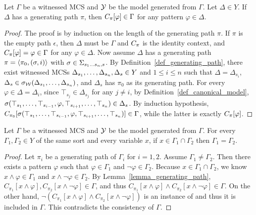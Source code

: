 \documentclass{amsart}
\begin{document}
\begin{lemma}
\label{lemma_generating_path}
Let $\Gamma$ be a witnessed MCS and
$\mathcal{Y}$ be the model generated from $\Gamma$.
Let $\Delta \in Y$.
If $\Delta$ has a generating path $\pi$,
then
${C_\pi}[\varphi] \in \Gamma$
for any pattern $\varphi \in \Delta$.
\end{lemma}
\begin{proof}
The proof is by induction on the length of the generating path $\pi$.
If $\pi$ is the empty path $\epsilon$, 
then $\Delta$ must be $\Gamma$ and ${C_\pi}$ is the identity 
context, and 
${C_\pi}[\varphi] = \varphi \in \Gamma$ for any $\varphi \in \Delta$.
Now assume $\Delta$ has a generating path
$\pi = \langle \pi_0 , (\sigma, i) \rangle$
with $\sigma \in \Sigma_{s_1 \dots s_n , s}$.
By Definition~\ref{def_generating_path}, there exist
witnessed MCSs
$\Delta_{s_1} ,\dots, \Delta_{s_n}, \Delta_s \in Y$
and $1 \le i \le n$ such that
$\Delta = \Delta_{s_i}$,
$\Delta_s \in {\sigma_{\mathcal{W}}}(\Delta_{s_1} ,\dots, \Delta_{s_n})$,
and $\Delta_s$ has $\pi_0$ as its generating path.
For every $\varphi \in \Delta = \Delta_i$,
since $\top_{s_j} \in \Delta_{s_j}$ for any $j \neq i$,
by Definition~\ref{def_canonical_model},
$\sigma(\top_{s_1} ,\dots, \top_{s_{i-1}} , \varphi , 
\top_{s_{i+1}} ,\dots, \top_{s_n}) \in \Delta_s$.
By induction hypothesis, 
$C_{\pi_0}[
\sigma(\top_{s_1} ,\dots, \top_{s_{i-1}} , \varphi , 
\top_{s_{i+1}} ,\dots, \top_{s_n})] \in \Gamma$,
while the latter is exactly ${C_\pi}[\varphi]$.
\end{proof}

\begin{lemma}
\label{lemma_singleton_variable}
Let $\Gamma$ be a witnessed MCS and
$\mathcal{Y}$ be the model generated from $\Gamma$.
For every $\Gamma_1, \Gamma_2 \in Y$ of the same sort
and every variable $x$,
if $x \in \Gamma_1 \cap \Gamma_2$ then $\Gamma_1 = \Gamma_2$.
\end{lemma}
\begin{proof}
Let $\pi_i$ be a generating path of $\Gamma_i$
for $i = 1, 2$.
Assume $\Gamma_1 \neq \Gamma_2$.
Then there exists a pattern $\varphi$ such that
$\varphi \in \Gamma_1$ and $\neg \varphi \in \Gamma_2$.
Because $x \in \Gamma_1 \cap \Gamma_2$, 
we know 
$x \wedge \varphi \in \Gamma_1$ and 
$x \wedge \neg \varphi \in \Gamma_2$.
By Lemma~\ref{lemma_generating_path},
$C_{\pi_1}[x \wedge \varphi], 
 C_{\pi_2}[x \wedge \neg \varphi] \in {\Gamma}$,
and thus 
$C_{\pi_1}[x \wedge \varphi] \wedge
 C_{\pi_2}[x \wedge \neg \varphi]
 \in \Gamma$.
On the other hand, 
$\neg(
 C_{\pi_1}[x \wedge \varphi] \wedge
 C_{\pi_2}[x \wedge \neg \varphi]
 )
$
is an instance of \singletonvariable
and thus it is included in ${\Gamma}$.
This contradicts the consistency of ${\Gamma}$.
\end{proof}
\end{document}
